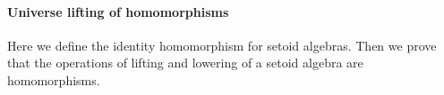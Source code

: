 \paragraph*{Universe lifting of homomorphisms}
Here we define the identity homomorphism for setoid algebras. Then we prove that the
operations of lifting and lowering of a setoid algebra are homomorphisms.

\begin{code}%
\>[0]\<%
\\
\>[0]\AgdaSpace{}%
\AgdaSymbol{:}\AgdaSpace{}%
\AgdaSymbol{\{}\AgdaSpace{}%
\AgdaSymbol{:}\AgdaSpace{}%
\AgdaSpace{}%
\AgdaSpace{}%
\AgdaSymbol{\}}\AgdaSpace{}%
\AgdaSpace{}%
\AgdaSpace{}%
\AgdaSpace{}%
\<%
\\
\>[0]\AgdaSpace{}%
\AgdaSymbol{\{}\AgdaSpace{}%
\AgdaSymbol{=}\AgdaSpace{}%
\AgdaSymbol{\}}\AgdaSpace{}%
\AgdaSymbol{=}\AgdaSpace{}%
\AgdaSpace{}%
\AgdaOperator{\AgdaInductiveConstructor{,}}\AgdaSpace{}%
\AgdaSpace{}%
\AgdaSymbol{(}\AgdaSpace{}%
\AgdaSymbol{)}\AgdaSpace{}%
\AgdaSpace{}%
\AgdaSpace{}%
\AgdaSpace{}%
\AgdaSymbol{(}\AgdaSpace{}%
\AgdaSpace{}%
\AgdaSpace{}%
\AgdaSymbol{)}\AgdaSpace{}%
\AgdaSpace{}%
\AgdaSymbol{(}\AgdaSpace{}%
\AgdaSpace{}%
\AgdaSymbol{)}\<%
\\
%
\\[\AgdaEmptyExtraSkip]%
\>[0]\AgdaSpace{}%
\AgdaModule{\AgdaUnderscore{}}\AgdaSpace{}%
\AgdaSymbol{\{}\AgdaSpace{}%
\AgdaSymbol{:}\AgdaSpace{}%
\AgdaSpace{}%
\AgdaSpace{}%
\AgdaSymbol{\}\{}\AgdaSpace{}%
\AgdaSymbol{:}\AgdaSpace{}%
\AgdaSymbol{\}}\AgdaSpace{}%
\<%
\\
\>[0][@{}l@{\AgdaIndent{0}}]%
\>[1]\AgdaSpace{}%
\AgdaSpace{}%
\AgdaOperator{\AgdaFunction{𝔻[}}\AgdaSpace{}%
\AgdaSpace{}%
\AgdaOperator{\AgdaFunction{]}}%
\>[33]\AgdaSpace{}%
\AgdaSymbol{(}\AgdaSpace{}%
\AgdaSpace{}%
\AgdaSymbol{)}%
\>[54]\AgdaSpace{}%
\AgdaSymbol{(}\AgdaSpace{}%

\end{code}
